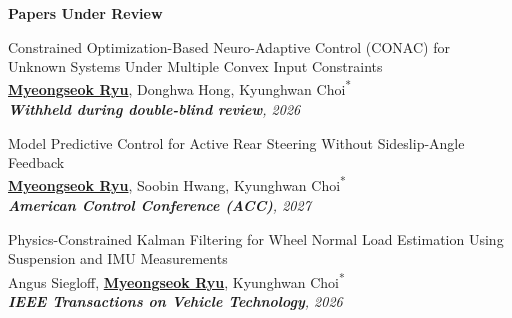 
\footnotesize{\textbf{Papers Under Review}

\begin{etaremune}

    \item {
        Constrained Optimization-Based Neuro-Adaptive Control (CONAC) for Unknown Systems Under Multiple Convex Input Constraints
        \\
        \textbf{\underline{Myeongseok Ryu}}, Donghwa Hong, Kyunghwan Choi\textsuperscript{{*}}
        \\
        \textit{
            \textbf{Withheld during double-blind review}, 2026
        }
    }

    \item {
        Model Predictive Control for Active Rear Steering Without Sideslip-Angle Feedback
        \\
        \textbf{\underline{Myeongseok Ryu}}, Soobin Hwang, Kyunghwan Choi\textsuperscript{{*}}
        \\
        \textit{
            \textbf{American Control Conference (ACC)}, 2027
        }
    }

    \item {
        Physics-Constrained Kalman Filtering for Wheel Normal Load Estimation Using Suspension and IMU Measurements
        \\
        Angus Siegloff, \textbf{\underline{Myeongseok Ryu}}, Kyunghwan Choi\textsuperscript{{*}}
        \\
        \textit{
            \textbf{IEEE Transactions on Vehicle Technology}, 2026
        }
    }

\end{etaremune}}
    
